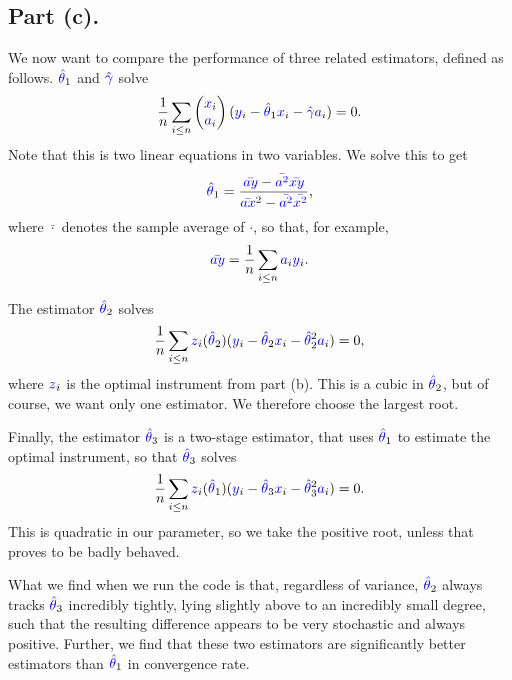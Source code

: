 \documentclass{article}
\renewcommand{\r}[1]{\textcolor{blue}{#1}}
\begin{document}
\subsection{Part (c).}
We now want to compare the performance of three related estimators, defined as follows. $\r{\hat{\theta}}_{1}$ and $\r{\hat{\gamma}}$ solve
\begin{equation} \frac{1}{n}\sum_{i\leq n}\begin{pmatrix} \r{x}_{i}\\ \r{a}_{i}\end{pmatrix}(\r{y}_{i}-\r{\hat{\theta}}_{1}\r{x}_{i}-\r{\hat{\gamma}}\r{a}_{i})=0.\end{equation}
Note that this is two linear equations in two variables. We solve this to get
\begin{equation} \r{\hat{\theta}}_{1} = \frac{\r{\bar{ay}}-\r{\bar{a^{2}}}\r{\bar{xy}}}{\r{\bar{ax}}^{2}-\r{\bar{a^{2}}}\r{\bar{x^{2}}}},\end{equation}
where $\bar{\cdot}$ denotes the sample average of $\cdot$, so that, for example,
\begin{equation} \r{\bar{ay}}=\frac{1}{n}\sum_{i\leq n}\r{a}_{i}\r{y}_{i}.\end{equation}

The estimator $\r{\hat{\theta}}_{2}$ solves
\begin{equation} \frac{1}{n}\sum_{i\leq n} \r{z}_{i}(\r{\hat{\theta}}_{2})(\r{y}_{i}-\r{\hat{\theta}}_{2}\r{x}_{i}-\r{\hat{\theta}}_{2}^{2}\r{a}_{i})=0,\end{equation}
where $\r{z}_{i}$ is the optimal instrument from part (b). This is a cubic in $\r{\hat{\theta}}_{2}$, but of course, we want only one estimator. We therefore choose the largest root.

Finally, the estimator $\r{\hat{\theta}}_{3}$ is a two-stage estimator, that uses $\r{\hat{\theta}}_{1}$ to estimate the optimal instrument, so that $\r{\hat{\theta}}_{3}$ solves
\begin{equation} \frac{1}{n}\sum_{i\leq n}\r{z}_{i}(\r{\hat{\theta}}_{1})(\r{y}_{i}-\r{\hat{\theta}}_{3}\r{x}_{i}-\r{\hat{\theta}}_{3}^{2}\r{a}_{i})=0.\end{equation}
This is quadratic in our parameter, so we take the positive root, unless that proves to be badly behaved.

What we find when we run the code is that, regardless of variance, $\r{\hat{\theta}}_{2}$ always tracks $\r{\hat{\theta}}_{3}$ incredibly tightly, lying slightly above to an incredibly small degree, such that the resulting difference appears to be very stochastic and always positive. Further, we find that these two estimators are significantly better estimators than $\r{\hat{\theta}}_{1}$ in convergence rate.
\end{document}
